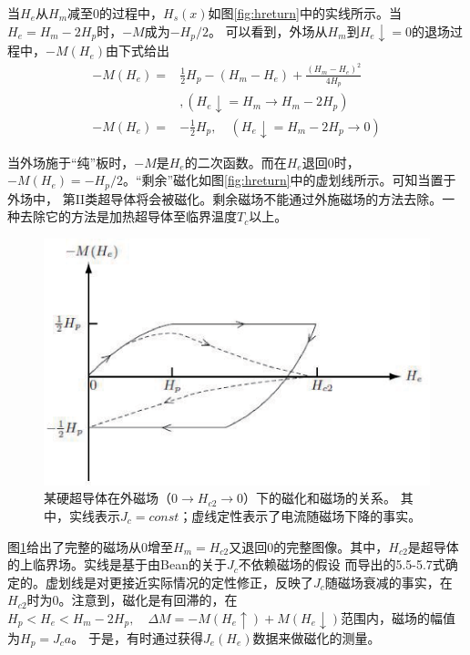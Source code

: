 当$H_e$从$H_m$减至0的过程中，$H_s(x)$如图\ref{fig:hreturn}中的实线所示。当$H_e=H_m-2H_p$时，$-M$成为$-H_p /2$。
可以看到，外场从$H_m$到$H_e\downarrow=0$的退场过程中，$-M(H_e)$由下式给出
\begin{eqnarray}
  -M(H_e) =&\frac{1}{2}H_p-(H_m-H_e)+\frac{(H_m-H_e)^2}{4H_p}\\ \nonumber
                 & ,(H_e\downarrow=H_m\rightarrow H_m-2H_p) \\ \nonumber
  -M(H_e) =&-\frac{1}{2}H_p,\quad (H_e\downarrow=H_m-2H_p\rightarrow 0)
\end{eqnarray}

当外场施于“纯”板时，$-M$是$H_e$的二次函数。而在$H_e$退回0时，$-M(H_e)=-H_p /2$。“剩余”磁化如图\ref{fig:hreturn}中的虚划线所示。可知当置于外场中，
第II类超导体将会被磁化。剩余磁场不能通过外施磁场的方法去除。一种去除它的方法是加热超导体至临界温度$T_c$以上。
\begin{figure}[htbp]
  \centering
 \includegraphics[scale=0.8]{chpt5/figs/fig5.3.eps}
  \caption{某硬超导体在外磁场（$0\rightarrow H_{c2}\rightarrow 0$）下的磁化和磁场的关系。
  其中，实线表示$J_c=const$；虚线定性表示了电流随磁场下降的事实。}\label{fig:magvsh}
\end{figure}
图\ref{fig:magvsh}给出了完整的磁场从0增至$H_m=H_{c2}$又退回0的完整图像。其中，$H_{c2}$是超导体的上临界场。实线是基于由Bean的关于$J_c$不依赖磁场的假设
而导出的5.5-5.7式确定的。虚划线是对更接近实际情况的定性修正，反映了$J_c$随磁场衰减的事实，在$H_{c2}$时为0。注意到，磁化是有回滞的，在
$H_p<H_e<H_m-2H_p,\quad \Delta M=-M(H_e\uparrow)+M(H_e\downarrow)$范围内，磁场的幅值为$H_p=J_c a$。
于是，有时通过获得$J_e(H_e)$数据来做磁化的测量。
